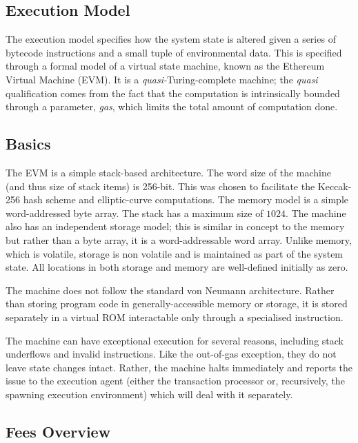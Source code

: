 \documentclass[9pt,oneside]{amsart}
\begin{document}
\begin{multicols}{2}
\section{Execution Model} \label{ch:model}

The execution model specifies how the system state is altered given a series of bytecode instructions and a small tuple of environmental data. This is specified through a formal model of a virtual state machine, known as the Ethereum Virtual Machine (EVM). It is a \textit{quasi-}Turing-complete machine; the \textit{quasi} qualification comes from the fact that the computation is intrinsically bounded through a parameter, \textit{gas}, which limits the total amount of computation done.

\subsection{Basics}

The EVM is a simple stack-based architecture. The word size of the machine (and thus size of stack items) is 256-bit. This was chosen to facilitate the Keccak-256 hash scheme and elliptic-curve computations. The memory model is a simple word-addressed byte array. The stack has a maximum size of $1024$. The machine also has an independent storage model; this is similar in concept to the memory but rather than a byte array, it is a word-addressable word array. Unlike memory, which is volatile, storage is non volatile and is maintained as part of the system state. All locations in both storage and memory are well-defined initially as zero.

The machine does not follow the standard von Neumann architecture. Rather than storing program code in generally-accessible memory or storage, it is stored separately in a virtual ROM interactable only through a specialised instruction.

The machine can have exceptional execution for several reasons, including stack underflows and invalid instructions. Like the out-of-gas exception, they do not leave state changes intact. Rather, the machine halts immediately and reports the issue to the execution agent (either the transaction processor or, recursively, the spawning execution environment) which will deal with it separately.

\subsection{Fees Overview}


\end{multicols}
\end{document}
